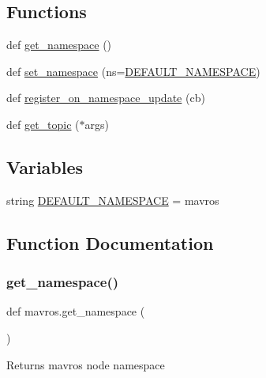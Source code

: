 \subsection*{Functions}
\begin{DoxyCompactItemize}
\item 
def \mbox{\hyperlink{namespacemavros_acbc9db4ba9fecc92e5e8298c1ed27c80}{get\+\_\+namespace}} ()
\item 
def \mbox{\hyperlink{namespacemavros_aab3c83241a5ac60bf037f155f74c42f2}{set\+\_\+namespace}} (ns=\mbox{\hyperlink{namespacemavros_a8507dfceb913a3fedcc98b864e82f2ab}{D\+E\+F\+A\+U\+L\+T\+\_\+\+N\+A\+M\+E\+S\+P\+A\+CE}})
\item 
def \mbox{\hyperlink{namespacemavros_a1443447b642479343c54c5e2dfd7cc72}{register\+\_\+on\+\_\+namespace\+\_\+update}} (cb)
\item 
def \mbox{\hyperlink{namespacemavros_ae24aef86483080d21765500ef50011b8}{get\+\_\+topic}} ($\ast$args)
\end{DoxyCompactItemize}
\subsection*{Variables}
\begin{DoxyCompactItemize}
\item 
string \mbox{\hyperlink{namespacemavros_a8507dfceb913a3fedcc98b864e82f2ab}{D\+E\+F\+A\+U\+L\+T\+\_\+\+N\+A\+M\+E\+S\+P\+A\+CE}} = \textquotesingle{}mavros\textquotesingle{}
\end{DoxyCompactItemize}


\subsection{Function Documentation}
\mbox{\label{namespacemavros_acbc9db4ba9fecc92e5e8298c1ed27c80}} 
\subsubsection{\texorpdfstring{get\_namespace()}{get\_namespace()}}
{\footnotesize\ttfamily def mavros.\+get\+\_\+namespace (\begin{DoxyParamCaption}{ }\end{DoxyParamCaption})}

\begin{DoxyVerb}Returns mavros node namespace
\end{DoxyVerb}
 

